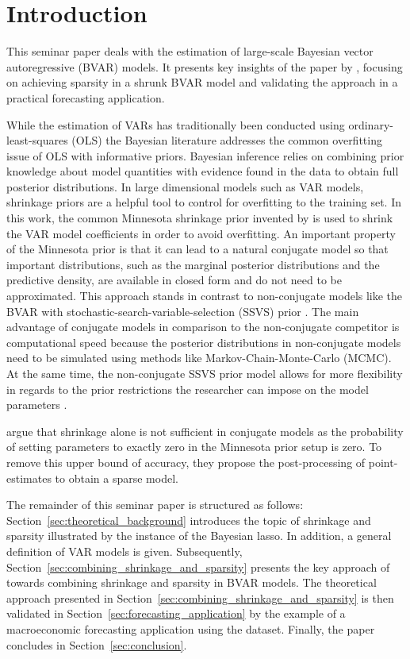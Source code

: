 \section{Introduction}
\label{sec:introduction}
This seminar paper deals with the estimation of large-scale Bayesian vector autoregressive (BVAR) models. It presents key insights of the paper  by \textcite{hauzenberger_combining_2021}, focusing on achieving sparsity in a shrunk BVAR model and validating the approach in a practical forecasting application.

While the estimation of VARs has traditionally been conducted using ordinary-least-squares (OLS) the Bayesian literature addresses the common overfitting issue of OLS with informative priors. Bayesian inference relies on combining prior knowledge about model quantities with evidence found in the data to obtain full posterior distributions. In large dimensional models such as VAR models, shrinkage priors are a helpful tool to control for overfitting to the training set. In this work, the common Minnesota shrinkage prior invented by \textcite{litterman_forecasting_1986} is used to shrink the VAR model coefficients in order to avoid overfitting. An important property of the Minnesota prior is that it can lead to a natural conjugate model so that important distributions, such as the marginal posterior distributions and the predictive density, are available in closed form and do not need to be approximated. This approach stands in contrast to non-conjugate models like the BVAR with stochastic-search-variable-selection (SSVS) prior \parencite{george_bayesian_2008}. The main advantage of conjugate models in comparison to the non-conjugate competitor is computational speed because the posterior distributions in non-conjugate models need to be simulated using methods like Markov-Chain-Monte-Carlo (MCMC). At the same time, the non-conjugate SSVS prior model allows for more flexibility in regards to the prior restrictions the researcher can impose on the model parameters \parencite{banbura_large_2010,koop_bayesian_2009,koop_forecasting_2013,george_bayesian_2008}.

\textcite{hauzenberger_combining_2021} argue that shrinkage alone is not sufficient in conjugate models as the probability of setting parameters to exactly zero in the Minnesota prior setup is zero. To remove this upper bound of accuracy, they propose the post-processing of point-estimates to obtain a sparse model.

The remainder of this seminar paper is structured as follows: Section~\ref{sec:theoretical_background} introduces the topic of shrinkage and sparsity illustrated by the instance of the Bayesian lasso. In addition, a general definition of VAR models is given. Subsequently, Section~\ref{sec:combining_shrinkage_and_sparsity} presents the key approach of \textcite{hauzenberger_combining_2021} towards combining shrinkage and sparsity in BVAR models. The theoretical approach presented in Section~\ref{sec:combining_shrinkage_and_sparsity} is then validated in Section~\ref{sec:forecasting_application} by the example of a macroeconomic forecasting application using the \textcite{mccracken_fred-md_2015} dataset. Finally, the paper concludes in Section~\ref{sec:conclusion}.
